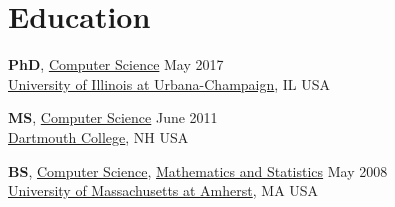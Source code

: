 
\section{\sc Education}

\textbf{PhD},
{\href{http://www.cs.illinois.edu/}{Computer Science}} \hfill May 2017 \\
{\href{http://www.illinois.edu/}{University of Illinois at Urbana-Champaign}}, IL USA \\
\vspace{-0.6cm}

\textbf{MS},
{\href{http://www.cs.dartmouth.edu/}{Computer Science}} \hfill June 2011 \\
{\href{http://www.dartmouth.edu/}{Dartmouth College}}, NH USA \\
\vspace{-0.6cm}

\textbf{BS},
{\href{http://www.cs.umass.edu/}{Computer Science}}, {\href{http://www.math.umass.edu/}{Mathematics and Statistics}}
 \hfill May 2008 \\
{\href{http://www.umass.edu/}{University of Massachusetts at Amherst}}, MA USA



%
%

